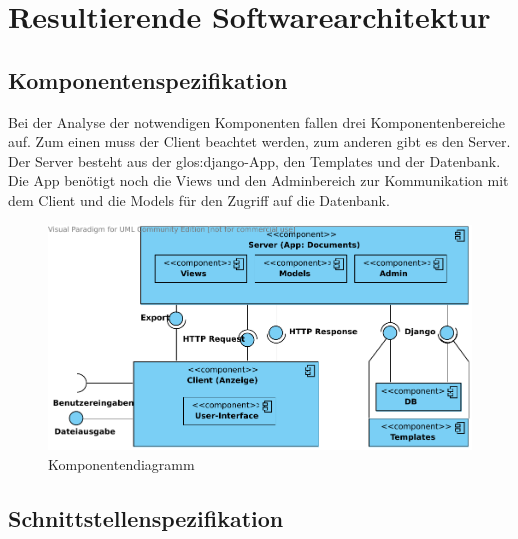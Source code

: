 \chapter{Resultierende Softwarearchitektur}

\section{Komponentenspezifikation}

Bei der Analyse der notwendigen Komponenten fallen drei Komponentenbereiche auf.
Zum einen muss der Client beachtet werden, zum anderen gibt es den Server. Der
Server besteht aus der \gls{glos:django}-App, den Templates und der Datenbank. Die App
benötigt noch die Views und den Adminbereich zur Kommunikation mit dem Client
und die Models für den Zugriff auf die Datenbank.

\begin{figure}[h]
    \begin{center}
\includegraphics[width=0.8\linewidth]{bilder/Komponentendiagramm.pdf}
\caption[Komponentendiagramm]{Komponentendiagramm}
\label{Komponentendiagramm}
    \end{center}
\end{figure}

\section{Schnittstellenspezifikation}

